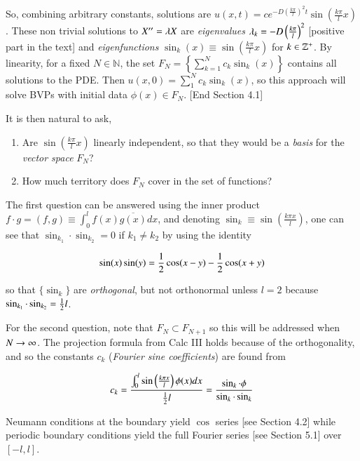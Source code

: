 \documentclass[12pt]{article}
\begin{document}
\bigskip So, combining arbitrary constants, solutions are $u(x,t) = c e^{-D\left(\frac{k \pi}{l}\right)^2 t} \sin\left(\frac{k \pi}{l}x \right)$.  
These non trivial solutions to $X'' = \lambda X$ are {\it eigenvalues} $\lambda_k = -D\left(\frac{k \pi}{l}\right)^2$ 
[positive part in the text] and {\it eigenfunctions} $\sin_k(x) \equiv \sin\left(\frac{k \pi}{l} x\right)$ for $k \in \mathbb{Z}^+$.  
By linearity, for a fixed $N \in \mathbb{N}$, the set $F_N = \left\{\sum^N_{k=1} 
c_k \sin_k(x) \right\}$ contains all solutions to the PDE.  Then $u(x,0) = \sum^N_1 c_k \sin_k(x)$, so
this approach will solve BVPs with initial data $\phi(x) \in F_N$. [End Section 4.1] 

\bigskip It is then natural to ask, 

\begin{enumerate}

\item Are $\sin\left(\frac{k \pi}{l} x\right)$ linearly independent, so that they would be a {\it basis} for the
{\it vector space} $F_N$?

\item How much territory does $F_N$ cover in the set of functions? 

\end{enumerate}

The first question can be answered using the inner product $f \cdot g = (f,g) \equiv \int^l_0 f(x)\overline{g(x)}dx$, and denoting
$\sin_k \equiv \sin\left(\frac{k \pi x}{l}\right)$, one can see that $\sin_{k_1} \cdot \sin_{k_2} = 0$ if $k_1 \neq k_2$ by using the identity

\[ \sin(x)\sin(y) = \frac{1}{2} \cos(x-y) - \frac{1}{2} \cos(x+y) \]

\noindent so that $\{\sin_k\}$ are {\it orthogonal}, but not orthonormal unless $l =2$ because $\sin_{k_1} \cdot \sin_{k_2} = \frac{1}{2} l$.  

\bigskip For the second question, note that $F_N \subset F_{N+1}$ so this will be addressed when $N \to \infty$.  The projection 
formula from Calc III holds because of the orthogonality, and so the constants $c_k$ ({\it Fourier sine coefficients}) are 
found from 

\[ c_k  = \frac{\int^l_0 \sin\left(\frac{k \pi x}{l}\right) \phi(x) dx}{\frac{1}{2} l} = \frac{\sin_k \cdot \phi}{\sin_k \cdot \sin_k} \]
  
\bsni Neumann conditions at the boundary yield $\cos$ series [see Section 4.2] while periodic boundary 
conditions yield the full Fourier series [see Section 5.1] over $[-l,l]$.
 
\end{document}
